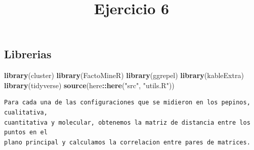 \documentclass[
]{article}
\title{Ejercicio 6}
\author{}
\date{\vspace{-2.5em}}
\newenvironment{Shaded}{\begin{snugshade}}{\end{snugshade}}
\newcommand{\DecValTok}[1]{\textcolor[rgb]{0.00,0.00,0.81}{#1}}
\newcommand{\KeywordTok}[1]{\textcolor[rgb]{0.13,0.29,0.53}{\textbf{#1}}}
\newcommand{\NormalTok}[1]{#1}
\newcommand{\OperatorTok}[1]{\textcolor[rgb]{0.81,0.36,0.00}{\textbf{#1}}}
\newcommand{\StringTok}[1]{\textcolor[rgb]{0.31,0.60,0.02}{#1}}
\begin{document}
\maketitle

\hypertarget{librerias}{%
\subsection{Librerias}\label{librerias}}

\begin{Shaded}
\begin{Highlighting}[]
\KeywordTok{library}\NormalTok{(cluster)}
\KeywordTok{library}\NormalTok{(FactoMineR)}
\KeywordTok{library}\NormalTok{(ggrepel)}
\KeywordTok{library}\NormalTok{(kableExtra)}
\KeywordTok{library}\NormalTok{(tidyverse)}
\KeywordTok{source}\NormalTok{(here}\OperatorTok{::}\KeywordTok{here}\NormalTok{(}\StringTok{"src"}\NormalTok{, }\StringTok{"utils.R"}\NormalTok{))}
\end{Highlighting}
\end{Shaded}

\begin{verbatim}
Para cada una de las configuraciones que se midieron en los pepinos, cualitativa, 
cuantitativa y molecular, obtenemos la matriz de distancia entre los puntos en el
plano principal y calculamos la correlacion entre pares de matrices.
\end{verbatim}

\begin{Shaded}
\end{Shaded}
\end{document}
